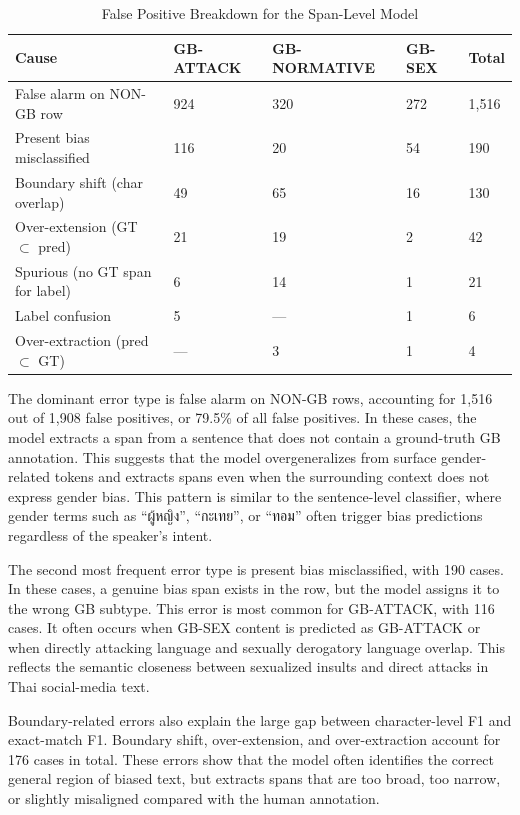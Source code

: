 \documentclass[12pt,oneside,openright,a4paper]{cpe-english-project}
\begin{document}
\begin{table}[H]
\centering
\small
\caption{False Positive Breakdown for the Span-Level Model}
\begin{tabular}{@{}lllll@{}}
\toprule
Cause & GB-ATTACK & GB-NORMATIVE & GB-SEX & Total \\
\midrule
False alarm on NON-GB row & 924 & 320 & 272 & 1,516 \\
Present bias misclassified & 116 & 20 & 54 & 190 \\
Boundary shift (char overlap) & 49 & 65 & 16 & 130 \\
Over-extension (GT $\subset$ pred) & 21 & 19 & 2 & 42 \\
Spurious (no GT span for label) & 6 & 14 & 1 & 21 \\
Label confusion & 5 & --- & 1 & 6 \\
Over-extraction (pred $\subset$ GT) & --- & 3 & 1 & 4 \\
\bottomrule
\end{tabular}
\end{table}

The dominant error type is false alarm on NON-GB rows, accounting for 1,516 out of 1,908 false positives, or 79.5\% of all false positives. In these cases, the model extracts a span from a sentence that does not contain a ground-truth GB annotation. This suggests that the model overgeneralizes from surface gender-related tokens and extracts spans even when the surrounding context does not express gender bias. This pattern is similar to the sentence-level classifier, where gender terms such as ``ผู้หญิง'', ``กะเทย'', or ``ทอม'' often trigger bias predictions regardless of the speaker's intent.

The second most frequent error type is present bias misclassified, with 190 cases. In these cases, a genuine bias span exists in the row, but the model assigns it to the wrong GB subtype. This error is most common for GB-ATTACK, with 116 cases. It often occurs when GB-SEX content is predicted as GB-ATTACK or when directly attacking language and sexually derogatory language overlap. This reflects the semantic closeness between sexualized insults and direct attacks in Thai social-media text.

Boundary-related errors also explain the large gap between character-level F1 and exact-match F1. Boundary shift, over-extension, and over-extraction account for 176 cases in total. These errors show that the model often identifies the correct general region of biased text, but extracts spans that are too broad, too narrow, or slightly misaligned compared with the human annotation.
\end{document}
